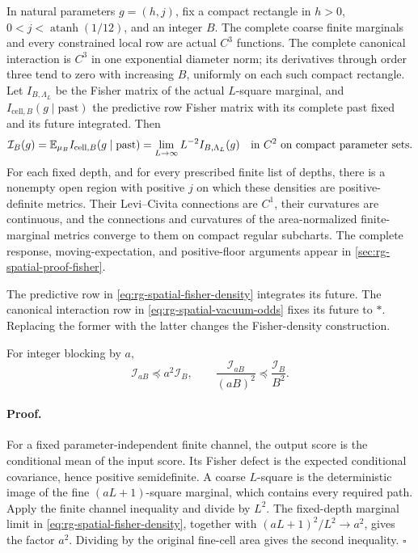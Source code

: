 In natural parameters \(g=(h,j)\), fix a compact rectangle in
\(h>0\), \(0<j<\operatorname{atanh}(1/12)\), and an integer \(B\).
The complete coarse finite marginals and every constrained local row are
actual \(C^3\) functions. The complete canonical interaction is \(C^3\)
in one exponential diameter norm; its derivatives through order three tend
to zero with increasing \(B\), uniformly on each such compact rectangle.
Let \(I_{B,\Lambda_L}\) be the Fisher matrix of the actual \(L\)-square
marginal, and \(I_{\mathrm{cell},B}(g\mid\mathrm{past})\) the predictive
row Fisher matrix with its complete past fixed and its future integrated.
Then
\begin{equation}
 \mathcal I_B(g)=\mathbb E_{\mu_B}I_{\mathrm{cell},B}(g\mid\mathrm{past})
 =\lim_{L\to\infty}L^{-2}I_{B,\Lambda_L}(g)
 \quad\hbox{in }C^2\hbox{ on compact parameter sets}.
 \label{eq:rg-spatial-fisher-density}
\end{equation}
For each fixed depth, and for every prescribed finite list of depths, there
is a nonempty open region with positive \(j\) on which these densities are
positive-definite metrics. Their Levi--Civita connections are \(C^1\),
their curvatures are continuous, and the connections and curvatures of the
area-normalized finite-marginal metrics converge to them on compact regular
subcharts. The complete response, moving-expectation, and positive-floor
arguments appear in \cref{sec:rg-spatial-proof-fisher}.

The predictive row in \cref{eq:rg-spatial-fisher-density} integrates its
future. The canonical interaction row in
\cref{eq:rg-spatial-vacuum-odds} fixes its future to \(*\). Replacing the
former with the latter changes the Fisher-density construction.

For integer blocking by \(a\),
\begin{equation}
 \mathcal I_{aB}\preceq a^2\mathcal I_B,\qquad
 \frac{\mathcal I_{aB}}{(aB)^2}\preceq\frac{\mathcal I_B}{B^2}.
 \label{eq:rg-spatial-fisher-contraction}
\end{equation}

\paragraph{Proof.}
For a fixed parameter-independent finite channel, the output score is the
conditional mean of the input score. Its Fisher defect is the expected
conditional covariance, hence positive semidefinite. A coarse \(L\)-square
is the deterministic image of the fine \((aL+1)\)-square marginal,
which contains every required path. Apply the finite channel inequality
and divide by \(L^2\). The fixed-depth marginal limit in
\cref{eq:rg-spatial-fisher-density}, together with
\((aL+1)^2/L^2\to a^2\), gives the factor \(a^2\). Dividing by the
original fine-cell area gives the second inequality. \hfill\(\square\)

